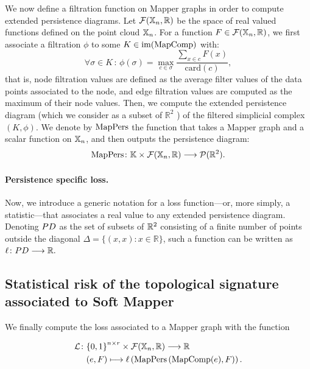 We now define a filtration function on Mapper graphs in order to compute extended persistence diagrams. Let  $\mathcal{F}(\mathbb{X}_n,\mathbb{R})$ be the space of real valued functions defined on the point cloud $\mathbb{X}_n$. 
For a function $F \in \mathcal{F}(\mathbb{X}_n,\mathbb{R})$, we first associate a filtration $\phi$ to some $K \in {\rm im}(\text{MapComp})$ with: 
$$\forall \sigma\in K\,:\,\phi(\sigma)=\max_{c\in\sigma}\frac{\sum_{x\in c} F(x) }{\text{card}(c)},$$
that is, node filtration values are defined as the average filter values of the data points associated to the node, and edge filtration values are computed as the maximum of their node values.  
Then, we compute the extended persistence diagram (which we consider as a subset of 
$\mathbb{R}^2$
) of the filtered simplicial complex $(K,\phi)$. We denote by $\text{MapPers}$ the function that takes a Mapper graph and a scalar function on $\mathbb{X}_n$, and then outputs the persistence diagram:
$$
\text{MapPers} \colon \mathbb{K}\times\mathcal{F}(\mathbb{X}_n,\mathbb{R})\longrightarrow \mathcal{P}(\mathbb{R}^2).
$$





\paragraph*{Persistence specific loss.}
Now, we introduce a generic notation for a loss function---or, more simply, a statistic---that associates a real value to any extended persistence diagram. Denoting $PD$ as the set of subsets of $\mathbb{R}^2$ consisting of a finite number of points outside the diagonal $\Delta=\{(x,x):x\in\mathbb{R}\}$, such a function can be written as $\ell \colon PD \longrightarrow \mathbb{R}.$

\subsection{Statistical risk of the topological signature associated to Soft Mapper}
 
We finally compute the loss 
associated to %
a Mapper graph with the function

\begin{align*}
\mathcal{L} \colon& {\{0,1\}}^{n\times r}\times\mathcal{F}(\mathbb{X}_n,\mathbb{R})  \longrightarrow \mathbb{R}\\
&(e,F) \longmapsto \ell \left(\text{MapPers} \left( \text{MapComp}(e),F \right) \right).
\end{align*}


